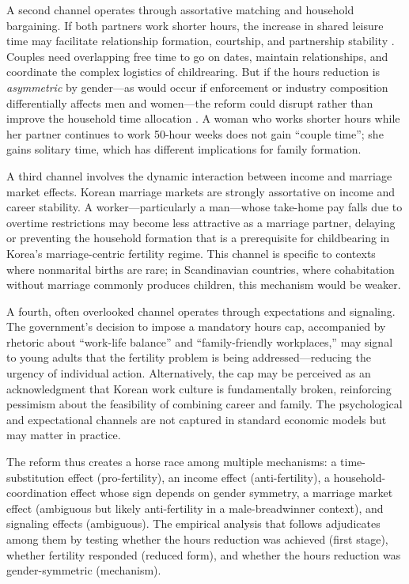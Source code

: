 \documentclass[12pt]{article}
\begin{document}
A second channel operates through assortative matching and household bargaining. If both partners work shorter hours, the increase in shared leisure time may facilitate relationship formation, courtship, and partnership stability \citep{greenwood2016technology}. Couples need overlapping free time to go on dates, maintain relationships, and coordinate the complex logistics of childrearing. But if the hours reduction is \textit{asymmetric} by gender---as would occur if enforcement or industry composition differentially affects men and women---the reform could disrupt rather than improve the household time allocation \citep{mcdonald2000gender, goldscheider2015gender}. A woman who works shorter hours while her partner continues to work 50-hour weeks does not gain ``couple time''; she gains solitary time, which has different implications for family formation.

A third channel involves the dynamic interaction between income and marriage market effects. Korean marriage markets are strongly assortative on income and career stability. A worker---particularly a man---whose take-home pay falls due to overtime restrictions may become less attractive as a marriage partner, delaying or preventing the household formation that is a prerequisite for childbearing in Korea's marriage-centric fertility regime. This channel is specific to contexts where nonmarital births are rare; in Scandinavian countries, where cohabitation without marriage commonly produces children, this mechanism would be weaker.

A fourth, often overlooked channel operates through expectations and signaling. The government's decision to impose a mandatory hours cap, accompanied by rhetoric about ``work-life balance'' and ``family-friendly workplaces,'' may signal to young adults that the fertility problem is being addressed---reducing the urgency of individual action. Alternatively, the cap may be perceived as an acknowledgment that Korean work culture is fundamentally broken, reinforcing pessimism about the feasibility of combining career and family. The psychological and expectational channels are not captured in standard economic models but may matter in practice.

The reform thus creates a horse race among multiple mechanisms: a time-substitution effect (pro-fertility), an income effect (anti-fertility), a household-coordination effect whose sign depends on gender symmetry, a marriage market effect (ambiguous but likely anti-fertility in a male-breadwinner context), and signaling effects (ambiguous). The empirical analysis that follows adjudicates among them by testing whether the hours reduction was achieved (first stage), whether fertility responded (reduced form), and whether the hours reduction was gender-symmetric (mechanism).
\end{document}
